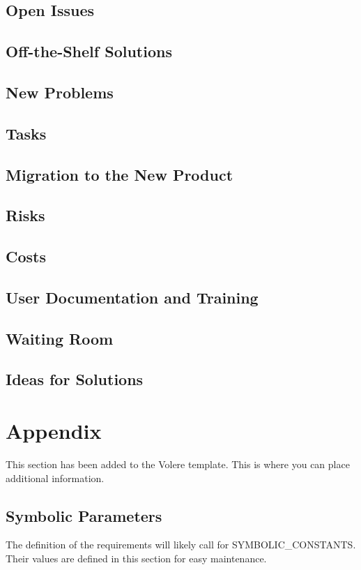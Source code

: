 \documentclass[12pt, titlepage]{article}
\begin{document}
\subsection{Open Issues}

\subsection{Off-the-Shelf Solutions}

\subsection{New Problems}

\subsection{Tasks}

\subsection{Migration to the New Product}

\subsection{Risks}

\subsection{Costs}

\subsection{User Documentation and Training}

\subsection{Waiting Room}

\subsection{Ideas for Solutions}

\newpage





\newpage

\section{Appendix}

This section has been added to the Volere template.  This is where you can place
additional information.

\subsection{Symbolic Parameters}

The definition of the requirements will likely call for SYMBOLIC\_CONSTANTS.
Their values are defined in this section for easy maintenance.
\end{document}

